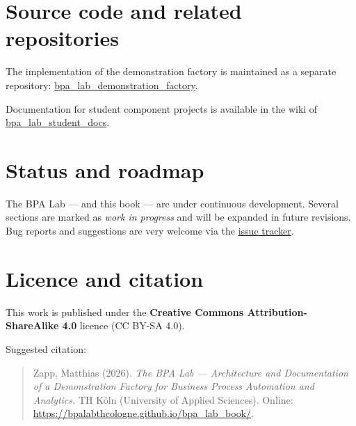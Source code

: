 \documentclass[
  english,
  11pt,
  a4paper,
]{scrbook}
\begin{document}
\section{Source code and related
repositories}\label{source-code-and-related-repositories}

The implementation of the demonstration factory is maintained as a
separate repository:
\href{https://github.com/BpaLabTHCologne/bpa_lab_demonstration_factory}{bpa\_lab\_demonstration\_factory}.

Documentation for student component projects is available in the wiki of
\href{https://github.com/BpaLabTHCologne/bpa_lab_student_docs/wiki}{bpa\_lab\_student\_docs}.

\section{Status and roadmap}\label{status-and-roadmap}

\begin{tcolorbox}[enhanced jigsaw, arc=.35mm, bottomrule=.15mm, bottomtitle=1mm, breakable, colback=white, colbacktitle=quarto-callout-important-color!10!white, colframe=quarto-callout-important-color-frame, coltitle=black, left=2mm, leftrule=.75mm, opacityback=0, opacitybacktitle=0.6, rightrule=.15mm, title=\textcolor{quarto-callout-important-color}{\faExclamation}\hspace{0.5em}{Work in progress}, titlerule=0mm, toprule=.15mm, toptitle=1mm]

The BPA Lab --- and this book --- are under continuous development.
Several sections are marked as \emph{work in progress} and will be
expanded in future revisions. Bug reports and suggestions are very
welcome via the
\href{https://github.com/BpaLabTHCologne/bpa_lab_book/issues}{issue
tracker}.

\end{tcolorbox}

\section{Licence and citation}\label{licence-and-citation}

This work is published under the \textbf{Creative Commons
Attribution-ShareAlike 4.0} licence (CC BY-SA 4.0).

Suggested citation:

\begin{quote}
Zapp, Matthias (2026). \emph{The BPA Lab --- Architecture and
Documentation of a Demonstration Factory for Business Process Automation
and Analytics.} TH Köln (University of Applied Sciences). Online:
\url{https://bpalabthcologne.github.io/bpa_lab_book/}.
\end{quote}
\end{document}
